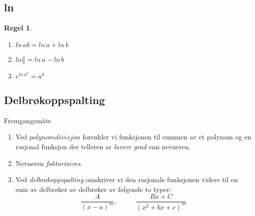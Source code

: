 \documentclass[11pt]{article}
\theoremstyle{definition}
\theoremstyle{definition}
\theoremstyle{definition}
\theoremstyle{definition}
\theoremstyle{definition}
\newtheorem{regel}{Regel}
\newenvironment{fregel}
{\begin{mdframed}[style=minstil]\begin{regel}}
		{\end{regel}\end{mdframed}}
\theoremstyle{definition}
\begin{document}
	\newpage
	
	\subsection{ln}
	
	\begin{fregel} \leavevmode
		
	\begin{enumerate}
		\item \(ln\,ab=ln\,a+ln\,b\)
		\item \(ln\frac{a}{b}=ln\,a-ln\,b\)
		\item\(e^{ln\,a^k}=a^k\)
	\end{enumerate}
		
	\end{fregel}
	
	\newpage
	
	\subsection{Delbrøkoppspalting}
	  
	Fremgangsmåte
	\begin{enumerate}
		\item Ved \(\textit{polynomdivisjon}\) forenkler vi funksjonen til summen av et polynom og en rasjonal funksjon der telleren ar \textit{lavere grad} enn nevneren.
		\item Nevneren \textit{faktoriseres}.
		\item Ved \textit{delbrøkoppspalting} omskriver vi den rasjonale funksjonen videre til en sum av delbrøker av delbrøker av følgende to typer:
		\[\dfrac{A}{(x-a)^m}, \hspace{32pt} \dfrac{Bx+C}{(x^2+bx+c)^m} \]
	\end{enumerate}  
	  
\end{document}
